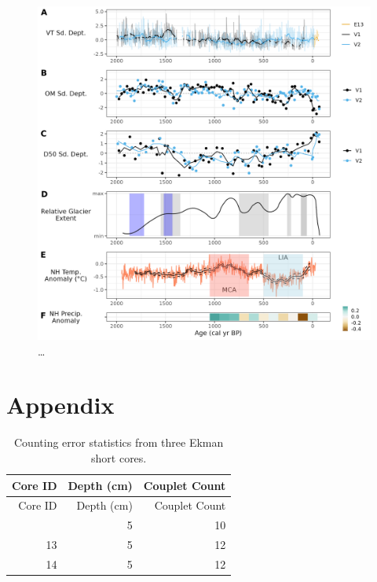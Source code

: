\documentclass[
  letterpaper,
  DIV=11,
  numbers=noendperiod]{scrartcl}
\begin{document}
\begin{figure}

{\centering \includegraphics[width=1\textwidth,height=\textheight]{figs/all_core_stats_2k_anomalies.jpg}

}

\caption{\label{fig-proxy-comparison}\ldots{}}

\end{figure}

\pagebreak

\hypertarget{appendix}{%
\section{Appendix}\label{appendix}}

\hypertarget{tbl-ekErr}{}
\begin{longtable}[]{@{}rrr@{}}
\caption{\label{tbl-ekErr}Counting error statistics from three Ekman
short cores.}\tabularnewline
\toprule\noalign{}
Core ID & Depth (cm) & Couplet Count \\
\midrule\noalign{}
\endfirsthead
\toprule\noalign{}
Core ID & Depth (cm) & Couplet Count \\
\midrule\noalign{}
\endhead
\bottomrule\noalign{}
\endlastfoot
12 & 5 & 10 \\
13 & 5 & 12 \\
14 & 5 & 12 \\
\end{longtable}
\end{document}
